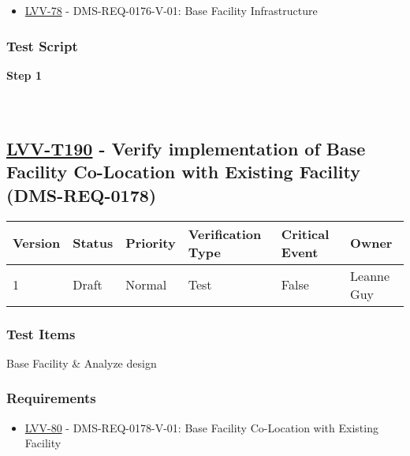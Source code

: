 \begin{itemize}
\tightlist
\item
  \href{https://jira.lsstcorp.org/browse/LVV-78}{LVV-78} -
  DMS-REQ-0176-V-01: Base Facility Infrastructure
\end{itemize}

\hypertarget{test-script-166}{%
\subsubsection{Test Script}\label{test-script-166}}

\textbf{Step 1}\\
~\\
~\\

\hypertarget{lvv-t190---verify-implementation-of-base-facility-co-location-with-existing-facility-dms-req-0178}{%
\subsection{\texorpdfstring{\href{https://jira.lsstcorp.org/secure/Tests.jspa\#/testCase/LVV-T190}{LVV-T190}
- Verify implementation of Base Facility Co-Location with Existing
Facility
(DMS-REQ-0178)}{LVV-T190 - Verify implementation of Base Facility Co-Location with Existing Facility (DMS-REQ-0178)}}\label{lvv-t190---verify-implementation-of-base-facility-co-location-with-existing-facility-dms-req-0178}}

\begin{longtable}[]{@{}llllll@{}}
\toprule
Version & Status & Priority & Verification Type & Critical Event &
Owner\tabularnewline
\midrule
\endhead
1 & Draft & Normal & Test & False & Leanne Guy\tabularnewline
\bottomrule
\end{longtable}

\hypertarget{test-items-166}{%
\subsubsection{Test Items}\label{test-items-166}}

Base Facility \& Analyze design

\hypertarget{requirements-167}{%
\subsubsection{Requirements}\label{requirements-167}}

\begin{itemize}
\tightlist
\item
  \href{https://jira.lsstcorp.org/browse/LVV-80}{LVV-80} -
  DMS-REQ-0178-V-01: Base Facility Co-Location with Existing Facility
\end{itemize}

